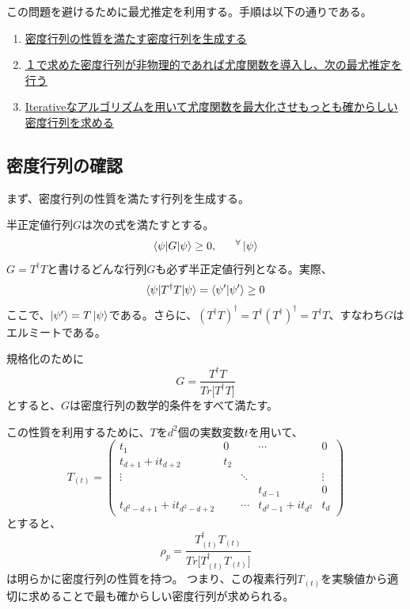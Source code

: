 \documentclass[11pt,a4j,notitlepage]{jreport}
\begin{document}
	この問題を避けるために最尤推定を利用する。手順は以下の通りである。

	\begin{enumerate}
		\item \underline{密度行列の性質を満たす密度行列を生成する}
		\item \underline{１で求めた密度行列が非物理的であれば尤度関数を導入し、次の最尤推定を行う}
		\item \underline{Iterativeなアルゴリズムを用いて尤度関数を最大化させもっとも確からしい密度行列を求める}
	\end{enumerate}


	\subsection{密度行列の確認}

	まず、密度行列の性質を満たす行列を生成する。

	半正定値行列$G$は次の式を満たすとする。
	\begin{equation}
		\braket{\psi | G | \psi} \geq 0,\ \ \ \ \ ^\forall \ket{\psi}
	\end{equation}
	$G = T^\dagger T$と書けるどんな行列$G$も必ず半正定値行列となる。実際、
	\begin{equation}
		\braket{\psi | T^\dagger T | \psi} = \braket{\psi' | \psi'} \geq 0
	\end{equation}
	ここで、$\ket{\psi'} = T \ket{\psi}$である。さらに、$(T^\dagger T)^\dagger = T^\dagger (T^\dagger)^\dagger = T^\dagger T$、すなわち$G$はエルミートである。

	規格化のために
	\begin{equation}
		G = \frac{T^\dagger T}{Tr \big[ T^\dagger T \big] } 
	\end{equation}
	とすると、$G$は密度行列の数学的条件をすべて満たす。

	この性質を利用するために、$T$を$d^2$個の実数変数$t$を用いて、
	\begin{equation}
		T_{(t)} = \begin{pmatrix}
			t_1 & 0 & & \cdots & 0 \\
			t_{d+1} + it_{d+2} & t_2 & & & \\
			\vdots & & \ddots &  & \vdots \\
			& & & t_{d-1} & 0 \\
			t_{d^2 - d + 1} + it_{d^2 - d + 2} & & \cdots & t_{d^2 - 1} + it_{d^2} & t_d
		\end{pmatrix}
	\end{equation}
	とすると、
	\begin{equation}
		\rho_p = \frac{T^\dagger_{(t)} T_{(t)}}{Tr \big[ T^\dagger_{(t)} T_{(t)} \big] }
	\end{equation}
	は明らかに密度行列の性質を持つ。
	つまり、この複素行列$T_{(t)}$を実験値から適切に求めることで最も確からしい密度行列が求められる。
\end{document}
